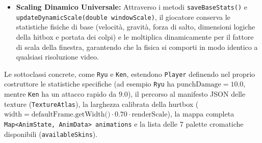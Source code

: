 \documentclass[11pt, a4paper]{article}
\begin{document}
\begin{itemize}
\begin{enumerate}
        \item \emph{Difesa (\texttt{isDefending}):} seleziona \texttt{BLOCK} o \texttt{CROUCH\_BLOCK};
        \item \emph{Postura e Movimento (\texttt{isCrouching}, \texttt{!isGrounded}, \texttt{isMoving}):} seleziona rispettivamente \texttt{CROUCH}, \texttt{JUMP} o \texttt{WALK};
        \item \emph{Stato di riposo:} imposta \texttt{MENU\_IDLE} (se nel menu di selezione) oppure \texttt{IDLE\_RIGHT/LEFT}.
    \end{enumerate}
    \item \textbf{Scaling Dinamico Universale:} Attraverso i metodi \texttt{saveBaseStats()} e \texttt{updateDynamicScale(double windowScale)}, il giocatore conserva le statistiche fisiche di base (velocità, gravità, forza di salto, dimensioni logiche della hitbox e portata dei colpi) e le moltiplica dinamicamente per il fattore di scala della finestra, garantendo che la fisica si comporti in modo identico a qualsiasi risoluzione video.
\end{itemize}

Le sottoclassi concrete, come \texttt{Ryu} e \texttt{Ken}, estendono \texttt{Player} definendo nel proprio costruttore le statistiche specifiche (ad esempio \texttt{Ryu} ha $\text{punchDamage} = 10.0$, mentre \texttt{Ken} ha un attacco rapido da $9.0$), il percorso al manifesto JSON delle texture (\texttt{TextureAtlas}), la larghezza calibrata della hurtbox ($\text{width} = \text{defaultFrame.getWidth()} \cdot 0.70 \cdot \text{renderScale}$), la mappa completa \texttt{Map<AnimState, AnimData> animations} e la lista delle 7 palette cromatiche disponibili (\texttt{availableSkins}).
\end{document}
